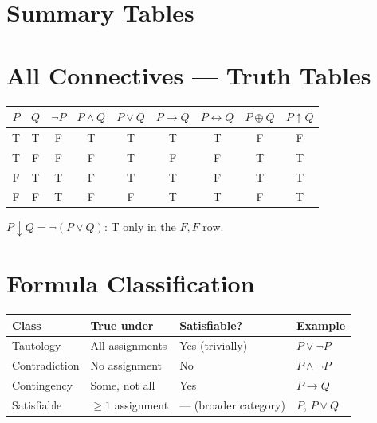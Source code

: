 
\section{Summary Tables}

\section*{All Connectives — Truth Tables}

\begin{center}
\renewcommand{\arraystretch}{1.2}
\begin{tabular}{cc|ccccccc}
\toprule
$P$ & $Q$ & $\neg P$ & $P{\wedge}Q$ & $P{\vee}Q$ & $P{\to}Q$ & $P{\leftrightarrow}Q$ & $P{\oplus}Q$ & $P{\uparrow}Q$ \\
\midrule
T & T & F & T & T & T & T & F & F \\
T & F & F & F & T & F & F & T & T \\
F & T & T & F & T & T & F & T & T \\
F & F & T & F & F & T & T & F & T \\
\bottomrule
\end{tabular}

\vspace{0.4em}
$P \downarrow Q = \neg(P \vee Q)$: T only in the $F,F$ row.
\end{center}

\section*{Formula Classification}

\begin{center}
\renewcommand{\arraystretch}{1.3}
\begin{tabular}{l l l l}
\toprule
\textbf{Class} & \textbf{True under} & \textbf{Satisfiable?} & \textbf{Example} \\
\midrule
Tautology     & All assignments     & Yes (trivially)       & $P \vee \neg P$ \\
Contradiction & No assignment       & No                    & $P \wedge \neg P$ \\
Contingency   & Some, not all       & Yes                   & $P \rightarrow Q$ \\
\midrule
Satisfiable   & $\geq 1$ assignment & — (broader category)  & $P$, $P \vee Q$ \\
\bottomrule
\end{tabular}
\end{center}

